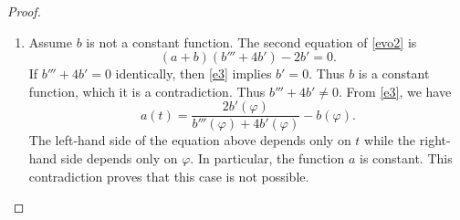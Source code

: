 \documentclass[10pt,a4paper]{amsart}
\def\r{\mathbb R}
\begin{document}
\begin{proof}
\begin{enumerate}
\begin{enumerate}
\item Case $a(t) =  \frac{1}{1+Ce^{2t}}$, where $t\in \r$ and $C>0$. Again, if $c=\frac12\log(C)$, let   
$$r(t)=\sinh^{-1}(e^{t+c}).$$
 Then
$$\kappa(t, \varphi) = \sqrt{p(t, \varphi)} = \sqrt{a(t)} = \frac{1}{\cosh(r(t))}.$$ 
In consequence, the solution is a family of equidistant lines. Notice that $k<1$.
 \end{enumerate}
 
 
\item Assume $b$ is not a constant function.   The second equation of \eqref{evo2} is  
\begin{equation}\label{e3}
(a+b)(b''' + 4b') - 2b' = 0.
\end{equation}
If $b'''+4b'=0$ identically, then \eqref{e3} implies $b'=0$. Thus $b$ is a constant function, which it is a contradiction. Thus  $b'''+4b'\not=0$.  From \eqref{e3}, we have 
 $$a(t) = \frac{2b'(\varphi)}{b''' (\varphi)+ 4b'(\varphi)} - b(\varphi).$$ 
The left-hand side of the equation above depends only on $t$ while the right-hand side depends only on $\varphi$. In particular, the function $a$ is constant. This contradiction proves that this case is not possible.  
\end{enumerate}
\end{proof}
\end{document}
